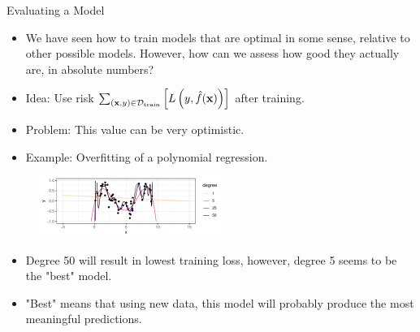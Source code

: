 \documentclass[11pt,compress,t,notes=noshow, xcolor=table]{beamer}
\begin{document}
\begin{vbframe}{Evaluating a Model}

\begin{itemize}
\item We have seen how to train models that are optimal in some sense, relative to other possible models. However, how can we assess how good they actually are, in absolute numbers?
\item Idea: Use risk $\sum_{(\mathbf{x}, y) \in \mathcal{D}_{\text{train}}} \left[ L\left(y, \hat{f}(\mathbf{x})\right) \right]$ after training.
\item Problem: This value can be very optimistic.
\item Example: Overfitting of a polynomial regression.
\end{itemize}

\begin{figure}
\includegraphics[width=0.53\textwidth]{figure/nutshell-overfit}
\end{figure}

\begin{itemize}
\item Degree 50 will result in lowest training loss, however, degree 5 seems to be the "best" model.
\item "Best" means that using new data, this model will probably produce the most meaningful predictions.
\end{itemize}

\end{vbframe}
\end{document}
